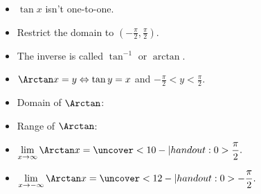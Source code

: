 \begin{frame}
\begin{columns}[c]
\begin{itemize}
\item<1->  $\tan x$ isn't one-to-one.
\item<2->  Restrict the domain to $(-\frac{\pi}2, \frac{\pi}2)$.
\item<3->  The inverse is called $\tan^{-1}$ or $\arctan$.
\item<4->  $\Arctan x = y \Leftrightarrow \tan y = x$ and $-\frac{\pi}2 < y < \frac{\pi}2$.
\item<5->  \alert<handout:0| 5-6>{Domain of $\Arctan$: }
\item<5->  \alert<handout:0| 7-8>{Range of $\Arctan$: }
\item<9->  \alert<handout:0| 9-10>{$\displaystyle \lim_{x\rightarrow \infty} \Arctan x = \uncover<10-| handout:0>{\frac{\pi}2.}$}
\item<9->  \alert<handout:0| 11-12>{$\displaystyle \lim_{x\rightarrow - \infty} \Arctan x = \uncover<12-| handout:0>{- \frac{\pi}2.}$}
\end{itemize}
\end{columns}
\end{frame}
